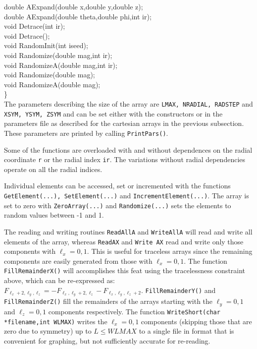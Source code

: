 \documentclass[10pt]{article}
\def\tab{\hspace*{9pt}}
\begin{document}
{\tab \tab double AExpand(double x,double y,double z);\\
\tab \tab double AExpand(double theta,double phi,int ir);\\
\tab \tab void Detrace(int ir);\\
\tab \tab void Detrace();\\
\tab \tab void RandomInit(int iseed);\\
\tab \tab void Randomize(double mag,int ir);\\
\tab \tab void RandomizeA(double mag,int ir);\\
\tab \tab void Randomize(double mag);\\
\tab \tab void RandomizeA(double mag);\\
\}\\
}
The parameters describing the size of the array are {\tt LMAX, NRADIAL, RADSTEP} and {\tt XSYM, YSYM, ZSYM} and can be set either with the constructors or in the parameters file as described for the cartesian arrays in the previous subsection. These parameters are printed by calling {\tt PrintPars()}.

Some of the functions are overloaded with and without dependences on the radial coordinate {\tt r} or the radial index {\tt ir}. The variations without radial dependencies operate on all the radial indices.

Individual elements can be accessed, set or incremented with the functions {\tt GetElement(...), SetElement(...)} and {\tt IncrementElement(...)}. The array is set to zero with {\tt ZeroArray(...)} and {\tt Randomize(...)} sets the elements to random values between -1 and 1.

The reading and writing routines {\tt ReadAllA} and {\tt WriteAllA} will read and write all elements of the array, whereas {\tt ReadAX} and {\tt Write AX} read and write only those components with $\ell_x=0,1$. This is useful for traceless arrays since the remaining components are easily generated from those with $\ell_x=0,1$. The function {\tt FillRemainderX()} will accomplishes this feat using the tracelessness constraint above, which can be re-expressed as: $F_{\ell_x+2,\ell_y,\ell_z}=-F_{\ell_x,\ell_y+2,\ell_z}-F_{\ell_x,\ell_y,\ell_z+2}$. {\tt FillRemainderY()} and {\tt FillRemainderZ()} fill the remainders of the arrays starting with the $\ell_y=0,1$ and $\ell_z=0,1$ components respectively. The function {\tt WriteShort(char *filename,int WLMAX)} writes the $\ell_x=0,1$ components (skipping those that are zero due to symmetry) up to $L\le WLMAX$ to a single file in format that is convenient for graphing, but not sufficiently accurate for re-reading.
\end{document}
